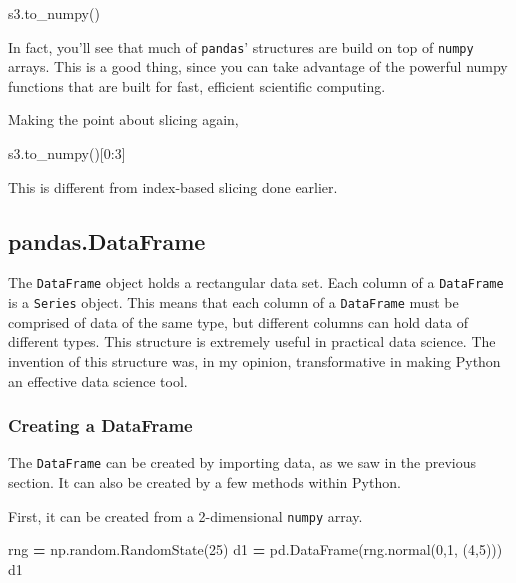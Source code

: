 \documentclass[
  letterpaper,
]{scrbook}
\newenvironment{Shaded}{\begin{snugshade}}{\end{snugshade}}
\newcommand{\DecValTok}[1]{\textcolor[rgb]{0.00,0.00,0.81}{#1}}
\newcommand{\NormalTok}[1]{#1}
\newcommand{\OperatorTok}[1]{\textcolor[rgb]{0.81,0.36,0.00}{\textbf{#1}}}
\begin{document}
\begin{Shaded}
\begin{Highlighting}[]
\NormalTok{s3.to\_numpy()}
\end{Highlighting}
\end{Shaded}

In fact, you'll see that much of \texttt{pandas}' structures are build on top of \texttt{numpy} arrays. This is a good thing, since you can take advantage of the powerful numpy functions that are built for fast, efficient scientific computing.

Making the point about slicing again,

\begin{Shaded}
\begin{Highlighting}[]
\NormalTok{s3.to\_numpy()[}\DecValTok{0}\NormalTok{:}\DecValTok{3}\NormalTok{]}
\end{Highlighting}
\end{Shaded}

This is different from index-based slicing done earlier.

\hypertarget{pandas.dataframe}{%
\subsection{pandas.DataFrame}\label{pandas.dataframe}}

The \texttt{DataFrame} object holds a rectangular data set. Each column of a \texttt{DataFrame} is a \texttt{Series} object. This means that each column of a \texttt{DataFrame} must be comprised of data of the same type, but different columns can hold data of different types. This structure is extremely useful in practical data science. The invention of this structure was, in my opinion, transformative in making Python an effective data science tool.

\hypertarget{creating-a-dataframe}{%
\subsubsection{Creating a DataFrame}\label{creating-a-dataframe}}

The \texttt{DataFrame} can be created by importing data, as we saw in the previous section. It can also be created by a few methods within Python.

First, it can be created from a 2-dimensional \texttt{numpy} array.

\begin{Shaded}
\begin{Highlighting}[]
\NormalTok{rng }\OperatorTok{=}\NormalTok{ np.random.RandomState(}\DecValTok{25}\NormalTok{)}
\NormalTok{d1 }\OperatorTok{=}\NormalTok{ pd.DataFrame(rng.normal(}\DecValTok{0}\NormalTok{,}\DecValTok{1}\NormalTok{, (}\DecValTok{4}\NormalTok{,}\DecValTok{5}\NormalTok{)))}
\NormalTok{d1}
\end{Highlighting}
\end{Shaded}
\end{document}
